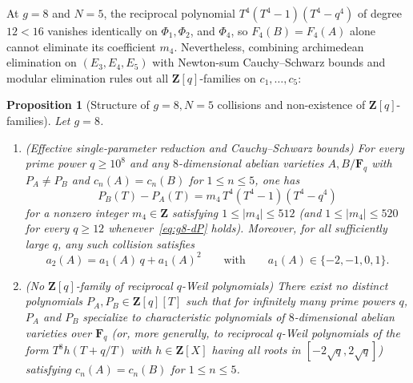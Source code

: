 \documentclass[11pt]{amsart}
\newtheorem{proposition}[theorem]{Proposition}
\theoremstyle{remark}
\newcommand{\F}{\mathbf{F}}
\newcommand{\Z}{\mathbf{Z}}
\begin{document}
At $g = 8$ and $N = 5$, the reciprocal polynomial $T^4(T^4 - 1)(T^4 - q^4)$ of degree $12 < 16$ vanishes identically on $\Phi_1, \Phi_2$, and $\Phi_4$, so $F_4(B) = F_4(A)$ alone cannot eliminate its coefficient $m_4$. Nevertheless, combining archimedean elimination on $(E_3, E_4, E_5)$ with Newton-sum Cauchy--Schwarz bounds and modular elimination rules out all $\Z[q]$-families on $c_1, \dots, c_5$:

\begin{proposition}[{Structure of $g = 8, N = 5$ collisions and non-existence of $\Z[q]$-families}]\label{prop:g8-N5}
Let $g = 8$.
\begin{enumerate}
\item \emph{(Effective single-parameter reduction and Cauchy--Schwarz bounds)} For every prime power $q \ge 10^8$ and any $8$-dimensional abelian varieties $A, B / \F_q$ with $P_A \ne P_B$ and $c_n(A) = c_n(B)$ for $1 \le n \le 5$, one has
\begin{equation}\label{eq:g8-dP}
P_B(T) - P_A(T) = m_4\, T^4(T^4 - 1)(T^4 - q^4)
\end{equation}
for a nonzero integer $m_4 \in \Z$ satisfying $1 \le |m_4| \le 512$ (and $1 \le |m_4| \le 520$ for every $q \ge 12$ whenever~\eqref{eq:g8-dP} holds). Moreover, for all sufficiently large $q$, any such collision satisfies
\[
a_2(A) = a_1(A)\, q + a_1(A)^2 \qquad \text{with} \qquad a_1(A) \in \{-2, -1, 0, 1\}.
\]
\item \emph{(No $\Z[q]$-family of reciprocal $q$-Weil polynomials)} There exist no distinct polynomials $P_A, P_B \in \Z[q][T]$ such that for infinitely many prime powers $q$, $P_A$ and $P_B$ specialize to characteristic polynomials of $8$-dimensional abelian varieties over $\F_q$ (or, more generally, to reciprocal $q$-Weil polynomials of the form $T^8 h(T + q/T)$ with $h \in \Z[X]$ having all roots in $[-2\sqrt{q},\allowbreak 2\sqrt{q}]$) satisfying $c_n(A) = c_n(B)$ for $1 \le n \le 5$.
\end{enumerate}
\end{proposition}
\end{document}
